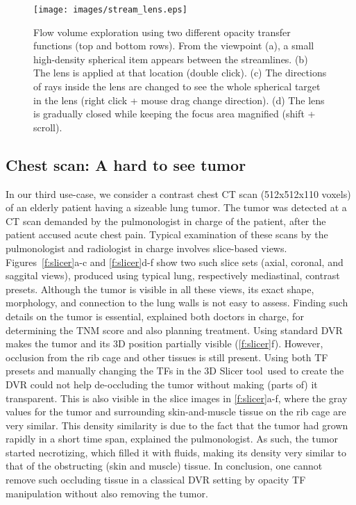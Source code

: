 \begin{figure}[htb]
\texttt{[image: images/stream\_lens.eps]}
\caption{Flow volume exploration using two different opacity transfer functions (top and bottom rows). From the viewpoint (a), a small high-density spherical item appears between the streamlines. (b) The lens is applied at that location (double click). (c) The directions of rays inside the lens are changed to see the whole spherical target in the lens (right click + mouse drag change direction). (d) The lens is gradually closed while keeping the focus area magnified (shift + scroll).}
\label{f:stream_lens}
\end{figure}

\subsection{Chest scan: A hard to see tumor}
%
In our third use-case, we consider a contrast chest CT scan (512x512x110 voxels) of an elderly patient having a sizeable lung tumor. The tumor was detected at a CT scan demanded by the pulmonologist in charge of the patient, after the patient accused acute chest pain. Typical examination of these scans by the pulmonologist and radiologist in charge involves slice-based views. Figures~\ref{f:slicer}a-c and \ref{f:slicer}d-f show two such slice sets (axial, coronal, and saggital views), produced using typical lung, respectively mediastinal, contrast presets. Although the tumor is visible in all these views, its exact shape, morphology, and connection to the lung walls is not easy to assess. Finding such details on the tumor is essential, explained both doctors in charge, for determining the TNM score and also planning treatment. Using standard DVR makes the tumor and its 3D position partially visible (\autoref{f:slicer}f). However, occlusion from the rib cage and other tissues is still present. Using both TF presets and manually changing the TFs in the 3D Slicer tool\,\cite{slicer} used to create the DVR could not help de-occluding the tumor without making (parts of) it transparent. This is also visible in the slice images in \autoref{f:slicer}a-f, where the gray values for the tumor and surrounding skin-and-muscle tissue on the rib cage are very similar. 
This density similarity is due to the fact that the tumor had grown rapidly in a short time span, explained the pulmonologist. As such, the tumor started necrotizing, which filled it with fluids, making its density very similar to that of the obstructing (skin and muscle) tissue. In conclusion, one cannot remove such occluding tissue in a classical DVR setting by opacity TF manipulation without also removing the tumor.

